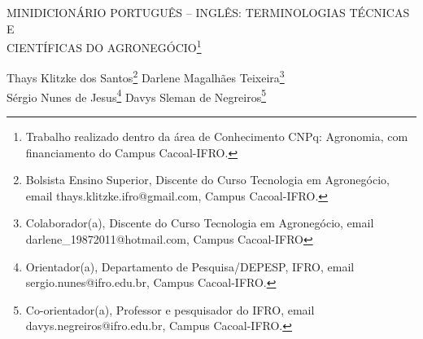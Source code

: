 \documentclass[article,12pt,onesidea,4paper,english,brazil]{abntex2}
\begin{document}
	
	
	\frenchspacing 
	
	\begin{center}
		\LARGE MINIDICIONÁRIO PORTUGUÊS -- INGLÊS: TERMINOLOGIAS TÉCNICAS E\\ CIENTÍFICAS DO AGRONEGÓCIO\footnote{Trabalho realizado dentro da área de Conhecimento CNPq: Agronomia, com financiamento do
			Campus Cacoal-IFRO.}
		
		\normalsize
		Thays Klitzke dos Santos\footnote{Bolsista Ensino Superior, Discente do Curso Tecnologia em Agronegócio, email
			thays.klitzke.ifro@gmail.com, Campus Cacoal-IFRO.} 
		Darlene Magalhães Teixeira\footnote{Colaborador(a), Discente do Curso Tecnologia em Agronegócio, email
			darlene\_19872011@hotmail.com, Campus Cacoal-IFRO} \\
		Sérgio Nunes de Jesus\footnote{Orientador(a), Departamento de Pesquisa/DEPESP, IFRO, email sergio.nunes@ifro.edu.br, Campus
			Cacoal-IFRO.} 
		Davys Sleman de Negreiros\footnote{Co-orientador(a), Professor e pesquisador do IFRO, email davys.negreiros@ifro.edu.br, Campus
			Cacoal-IFRO.} 
	\end{center}
	
\end{document}
